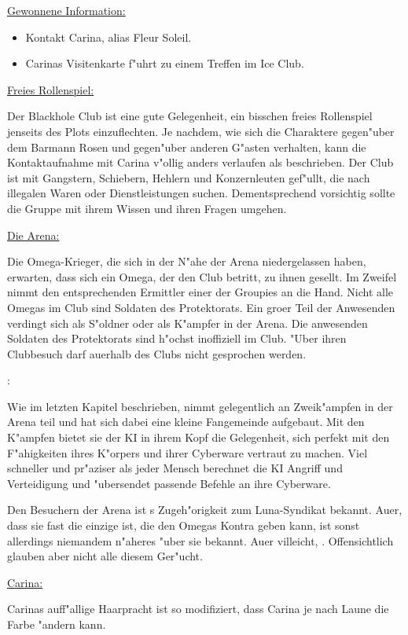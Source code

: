 \begin{remarks}
	\underline{Gewonnene Information:}

	\begin{itemize}
		\item Kontakt Carina, alias Fleur Soleil.
		\item Carinas Visitenkarte f"uhrt zu einem Treffen im Ice Club.
	\end{itemize}

	\underline{Freies Rollenspiel:}

	Der Blackhole Club ist eine gute Gelegenheit, ein bisschen freies Rollenspiel jenseits des Plots einzuflechten. Je nachdem, wie sich die Charaktere gegen"uber dem Barmann Rosen und gegen"uber anderen G"asten verhalten, kann die Kontaktaufnahme mit Carina v"ollig anders verlaufen als beschrieben. Der Club ist mit Gangstern, Schiebern, Hehlern und Konzernleuten gef"ullt, die nach illegalen Waren oder Dienstleistungen suchen. Dementsprechend vorsichtig sollte die Gruppe mit ihrem Wissen und ihren Fragen umgehen.

	\underline{Die Arena:}

	Die Omega-Krieger, die sich in der N"ahe der Arena niedergelassen haben, erwarten, dass sich ein Omega, der den Club betritt, zu ihnen gesellt. Im Zweifel nimmt den entsprechenden Ermittler einer der Groupies an die Hand. Nicht alle Omegas im Club sind Soldaten des Protektorats. Ein gro\3er Teil der Anwesenden verdingt sich als S"oldner oder als K"ampfer in der Arena. Die anwesenden Soldaten des Protektorats sind h"ochst inoffiziell im Club. "Uber ihren Clubbesuch darf au\3erhalb des Clubs nicht gesprochen werden.
\end{remarks}
\begin{remarks}
	\underline{\xl{}}:

	Wie im letzten Kapitel beschrieben, nimmt \xl{} gelegentlich an Zweik"ampfen in der Arena teil und hat sich dabei eine kleine Fangemeinde aufgebaut. Mit den K"ampfen bietet sie der KI in ihrem Kopf die Gelegenheit, sich perfekt mit den F"ahigkeiten ihres K"orpers und ihrer Cyberware vertraut zu machen. Viel schneller und pr"aziser als jeder Mensch berechnet die KI Angriff und Verteidigung und "ubersendet passende Befehle an ihre Cyberware.

	Den Besuchern der Arena ist \xl{}s Zugeh"origkeit zum Luna-Syndikat bekannt. Au\3er, dass sie fast die einzige ist, die den Omegas Kontra geben kann, ist sonst allerdings niemandem n"aheres "uber sie bekannt. Au\3er villeicht, . Offensichtlich glauben aber nicht alle diesem Ger"ucht.

	\underline{Carina:}
	
	Carinas auff"allige Haarpracht ist so modifiziert, dass Carina je nach Laune die Farbe "andern kann.
\end{remarks}


